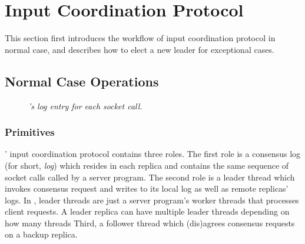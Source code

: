 \section{Input Coordination Protocol} \label{sec:input}

This section first introduces the workflow of \xxx input coordination protocol 
in normal case, and describes how to elect a new leader for exceptional 
cases.

\subsection{Normal Case Operations} \label{sec:normal}

\begin{figure}[t]
\centering
\begin{minipage}{.5\textwidth}
\end{minipage}
\vspace{-.1in}
\caption{{\em \xxx's log entry for each socket call.}} \label{fig:logentry}
\vspace{-.05in}
\end{figure}

\subsubsection{Primitives} \label{sec:primitive}


\xxx' input coordination protocol contains three roles. The first role is a 
\paxos consensus log (for short, \emph{log}) which resides in each replica and 
contains the same  sequence of socket calls called by a server program. The 
second role is a leader thread which invokes consensus request and writes to its 
local log as well as remote replicas' logs. In \xxx, leader threads are just 
a server program's worker threads that processes client requests. A leader 
replica can have multiple leader threads depending on how many threads  Third, 
a follower thread which (dis)agrees consensus requests on a backup replica.

